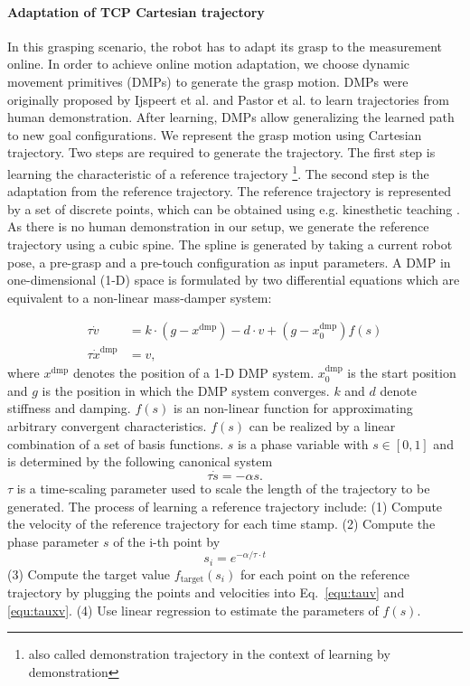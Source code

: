 \paragraph*{Adaptation of TCP Cartesian trajectory}
In this grasping scenario, the robot has to adapt its grasp to the measurement online. In order to achieve online motion adaptation, we choose dynamic movement primitives (DMPs) to generate the grasp motion. DMPs were originally proposed by Ijspeert et al. \cite{Ijspeert2013} and Pastor et al. \cite{Pastor2011} to learn trajectories from human demonstration. After learning, DMPs allow generalizing the learned path to new goal configurations. We represent the grasp motion using Cartesian trajectory. Two steps are required to generate the trajectory. The first step is learning the characteristic of a reference trajectory \footnote[1]{also called demonstration trajectory in the context of learning by demonstration}. The second step is the adaptation from the reference trajectory. 
The reference trajectory is represented by a set of discrete points, which can be obtained using e.g. kinesthetic teaching  \cite{Herzog2012}. As there is no human demonstration in our setup, we generate the reference trajectory using a cubic spine. The spline is generated by taking a current robot pose, a pre-grasp and a pre-touch configuration as input parameters. A DMP in one-dimensional (1-D) space is formulated by two differential equations which are equivalent to a non-linear mass-damper system:

 \begin{align}
  \label{equ:tauv}
 \tau \dot{v} &= k\cdot({g}-x^{\text{dmp}}) - d \cdot v + (g- {x}^{\text{dmp}}_0) f(s)  \\
 \label{equ:tauxv}
  \tau \dot{x}^{\text{dmp}} &= {v},
 \end{align}
where $x^{\text{dmp}}$ denotes the position of a 1-D DMP system. ${x}^{\text{dmp}}_0$ is the start position and $g$ is the position in which the DMP system converges.  $k$ and $d$ denote stiffness and damping. $f(s)$ is an non-linear function for approximating arbitrary convergent characteristics. $f(s)$ can be realized by a linear combination of a set of basis functions. $s$ is a phase variable with $s \in [0,1]$ and is determined by the following canonical system
\begin{equation}
 \tau \dot{s} = - \alpha s.
 \label{equ:canonicalsys}
\end{equation}
$\tau$ is a time-scaling parameter used to scale the length of the trajectory to be generated. The process of learning a reference trajectory include: (1) Compute the velocity of the reference trajectory for each time stamp. (2) Compute the phase parameter $s$ of the i-th point by 
\begin{equation}
 s_i = e^{- \alpha / \tau \cdot t }
 \label{equ:compute_phase}
\end{equation}
(3) Compute the target value $f_{\text{target}}(s_i)$ for each point on the reference trajectory by plugging the points and velocities into Eq.~\ref{equ:tauv} and \ref{equ:tauxv}. (4) Use linear regression to estimate the parameters of $f(s)$.

